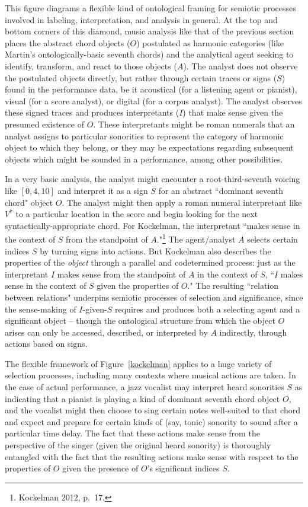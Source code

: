 This figure diagrams a flexible kind of ontological framing for semiotic processes involved in labeling, interpretation, and analysis in general.  At the top and bottom corners of this diamond, music analysis like that of the previous section places the abstract chord objects ($O$) postulated as harmonic categories (like Martin's ontologically-basic seventh chords) and the analytical agent seeking to identify, transform, and react to those objects ($A$).  The analyst does not observe the postulated objects directly, but rather through certain traces or signs ($S$) found in the performance data, be it acoustical (for a listening agent or pianist), visual (for a score analyst), or digital (for a corpus analyst).  The analyst observes these signed traces and produces interpretants ($I$) that make sense given the presumed existence of $O$.  These interpretants might be roman numerals that an analyst assigns to particular sonorities to represent the category of harmonic object to which they belong, or they may be expectations regarding subsequent objects which might be sounded in a performance, among other possibilities.

In a very basic analysis, the analyst might encounter a root-third-seventh voicing like $[0,4,10]$ and interpret it as a sign $S$ for an abstract ``dominant seventh chord" object $O$.  The analyst might then apply a roman numeral interpretant like $V^7$ to a particular location in the score and begin looking for the next syntactically-appropriate chord.  For Kockelman, the interpretant ``makes sense in the context of $S$ from the standpoint of $A$."\footnote{Kockelman 2012, p.\ 17.}  The agent/analyst $A$ selects certain indices $S$ by turning signs into actions.  But Kockelman also describes the properties of the \emph{object} through a parallel and codetermined process: just as the interpretant $I$ makes sense from the standpoint of $A$ in the context of $S$, ``$I$ makes sense in the context of $S$ given the properties of $O$."  The resulting ``relation between relations" underpins semiotic processes of selection and significance, since the sense-making of $I$-given-$S$ requires and produces both a selecting agent and a significant object -- though the ontological structure from which the object $O$ arises can only be accessed, described, or interpreted by $A$ indirectly, through actions based on signs.

The flexible framework of Figure~\ref{kockelman} applies to a huge variety of selection processes, including many contexts where musical actions are taken.  In the case of actual performance, a jazz vocalist may interpret heard sonorities $S$ as indicating that a pianist is playing a kind of dominant seventh chord object $O$, and the vocalist might then choose to sing certain notes well-suited to that chord and expect and prepare for certain kinds of (say, tonic) sonority to sound after a particular time delay.  The fact that these actions make sense from the perspective of the singer (given the original heard sonority) is thoroughly entangled with the fact that the resulting actions make sense with respect to the properties of $O$ given the presence of $O$'s significant indices $S$.

